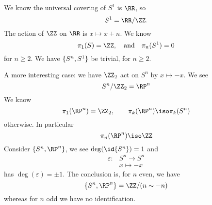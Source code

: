We know the universal covering of $S^1$ is $\RR$, so
\begin{equation}
S^{1}=\RR/\ZZ.
\end{equation}
The action of $\ZZ$ on $\RR$ is $x\mapsto x+n$. We know
\begin{equation}
\pi_{1}(S)=\ZZ,\quad\mbox{and}\quad\pi_{n}(S^{1})=0
\end{equation}
for $n\geq2$. We have $\homotopyClass(S^n,S^1)$ be trivial, for
$n\geq2$.

A more interesting case: we have $\ZZ_2$ act on $S^n$ by
$x\mapsto-x$. We see
\begin{equation}
S^{n}/\ZZ_2=\RP^n
\end{equation}
We know
\begin{equation}
\pi_{1}(\RP^n)=\ZZ_2,\quad\mbox\quad\pi_{k}(\RP^{n})\iso\pi_{k}(S^{n})
\end{equation}
otherwise. In particular
\begin{equation}
\pi_{n}(\RP^n)\iso\ZZ
\end{equation}
Consider $\homotopyClass(S^n,\RP^n)$, we see $\deg(\id{S^n})=1$
and
\begin{equation}
\begin{split}
\varepsilon\colon&S^n\to S^n\\
&x\mapsto-x
\end{split}
\end{equation}
has $\deg(\varepsilon)=\pm1$. The conclusion is, for $n$ even, we
have
\begin{equation}
\homotopyClass(S^n,\RP^n)=\ZZ/(n\sim-n)
\end{equation}
whereas for $n$ odd we have no identification.
%
